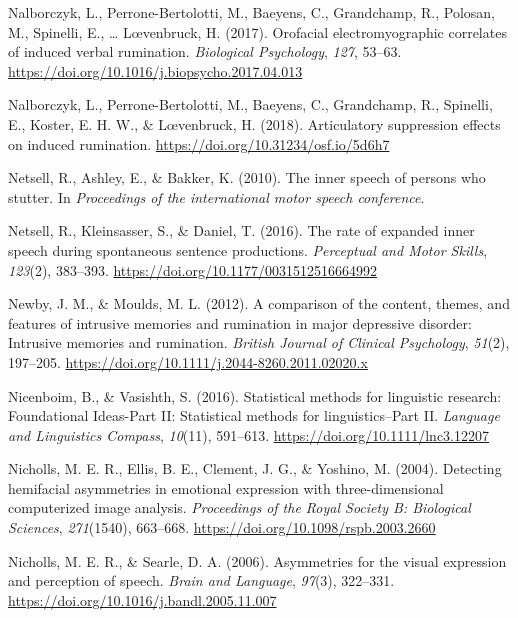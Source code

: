 \documentclass[a4paper,12pt,twoside,onecolumn,openright,final,oldfontcommands]{memoir}
\begin{document}
\leavevmode\hypertarget{ref-nalborczyk_orofacial_2017}{}%
Nalborczyk, L., Perrone-Bertolotti, M., Baeyens, C., Grandchamp, R., Polosan, M., Spinelli, E., \ldots{} Lœvenbruck, H. (2017). Orofacial electromyographic correlates of induced verbal rumination. \emph{Biological Psychology}, \emph{127}, 53--63. \url{https://doi.org/10.1016/j.biopsycho.2017.04.013}

\leavevmode\hypertarget{ref-nalborczyk_articulatory_2018}{}%
Nalborczyk, L., Perrone-Bertolotti, M., Baeyens, C., Grandchamp, R., Spinelli, E., Koster, E. H. W., \& Lœvenbruck, H. (2018). Articulatory suppression effects on induced rumination. \url{https://doi.org/10.31234/osf.io/5d6h7}

\leavevmode\hypertarget{ref-netsell_inner_2010}{}%
Netsell, R., Ashley, E., \& Bakker, K. (2010). The inner speech of persons who stutter. In \emph{Proceedings of the international motor speech conference}.

\leavevmode\hypertarget{ref-netsell_rate_2016}{}%
Netsell, R., Kleinsasser, S., \& Daniel, T. (2016). The rate of expanded inner speech during spontaneous sentence productions. \emph{Perceptual and Motor Skills}, \emph{123}(2), 383--393. \url{https://doi.org/10.1177/0031512516664992}

\leavevmode\hypertarget{ref-newby_comparison_2012}{}%
Newby, J. M., \& Moulds, M. L. (2012). A comparison of the content, themes, and features of intrusive memories and rumination in major depressive disorder: Intrusive memories and rumination. \emph{British Journal of Clinical Psychology}, \emph{51}(2), 197--205. \url{https://doi.org/10.1111/j.2044-8260.2011.02020.x}

\leavevmode\hypertarget{ref-nicenboim_statistical_2016}{}%
Nicenboim, B., \& Vasishth, S. (2016). Statistical methods for linguistic research: Foundational Ideas-Part II: Statistical methods for linguistics--Part II. \emph{Language and Linguistics Compass}, \emph{10}(11), 591--613. \url{https://doi.org/10.1111/lnc3.12207}

\leavevmode\hypertarget{ref-nicholls_detecting_2004}{}%
Nicholls, M. E. R., Ellis, B. E., Clement, J. G., \& Yoshino, M. (2004). Detecting hemifacial asymmetries in emotional expression with three-dimensional computerized image analysis. \emph{Proceedings of the Royal Society B: Biological Sciences}, \emph{271}(1540), 663--668. \url{https://doi.org/10.1098/rspb.2003.2660}

\leavevmode\hypertarget{ref-nicholls_asymmetries_2006}{}%
Nicholls, M. E. R., \& Searle, D. A. (2006). Asymmetries for the visual expression and perception of speech. \emph{Brain and Language}, \emph{97}(3), 322--331. \url{https://doi.org/10.1016/j.bandl.2005.11.007}
\end{document}
